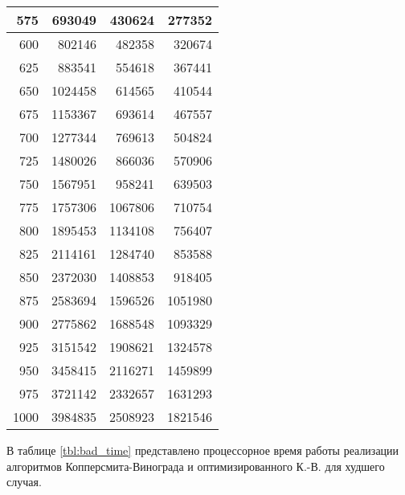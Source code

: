 \begin{table}[h]
\begin{center}
\begin{threeparttable}
\begin{tabular}{|r|r|r|r|}
			\hline
			575 & 693049 & 430624 & 277352 \\
			\hline
			600 & 802146 & 482358 & 320674 \\
			\hline
			625 & 883541 & 554618 & 367441 \\
			\hline
			650 & 1024458 & 614565 & 410544 \\
			\hline
			675 & 1153367 & 693614 & 467557 \\
			\hline
			700 & 1277344 & 769613 & 504824 \\
			\hline
			725 & 1480026 & 866036 & 570906 \\
			\hline
			750 & 1567951 & 958241 & 639503 \\
			\hline
			775 & 1757306 & 1067806 & 710754 \\
			\hline
			800 & 1895453 & 1134108 & 756407 \\
			\hline
			825 & 2114161 & 1284740 & 853588 \\
			\hline
			850 & 2372030 & 1408853 & 918405 \\
			\hline
			875 & 2583694 & 1596526 & 1051980 \\
			\hline
			900 & 2775862 & 1688548 & 1093329 \\
			\hline
			925 & 3151542 & 1908621 & 1324578 \\
			\hline
			950 & 3458415 & 2116271 & 1459899 \\
			\hline
			975 & 3721142 & 2332657 & 1631293 \\
			\hline
			1000 & 3984835 & 2508923 & 1821546 \\
			\hline
		\end{tabular}
	\end{threeparttable}
\end{center}
\end{table}

\clearpage

В таблице \ref{tbl:bad_time} представлено процессорное время работы реализации алгоритмов
Копперсмита-Винограда и оптимизированного К.-В. для худшего случая.


